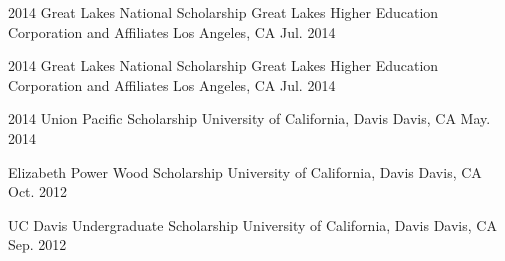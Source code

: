 



\begin{cvhonors}

  \cvhonor
    {2014 Great Lakes National Scholarship} %
    {Great Lakes Higher Education Corporation and Affiliates} %
    {Los Angeles, CA} %
    {Jul. 2014} %

  \cvhonor
    {2014 Great Lakes National Scholarship} %
    {Great Lakes Higher Education Corporation and Affiliates} %
    {Los Angeles, CA} %
    {Jul. 2014} %

\end{cvhonors}




\begin{cvhonors}

  \cvhonor
    {2014 Union Pacific Scholarship} %
    {University of California, Davis} %
    {Davis, CA} %
    {May. 2014} %

  \cvhonor
    {Elizabeth Power Wood Scholarship} %
    {University of California, Davis} %
    {Davis, CA} %
    {Oct. 2012} %

  \cvhonor
    {UC Davis Undergraduate Scholarship} %
    {University of California, Davis} %
    {Davis, CA} %
    {Sep. 2012} %

\end{cvhonors}


